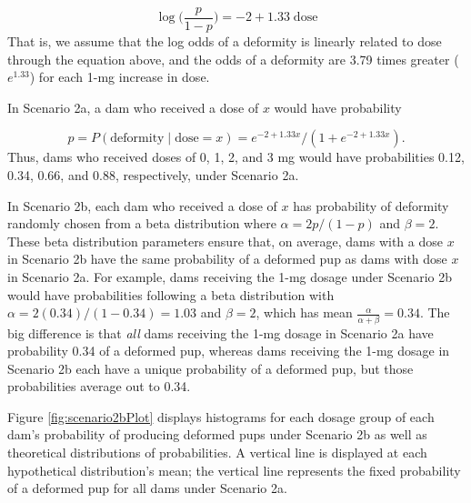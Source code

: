 \documentclass[
]{krantz}
\begin{document}
\[ \log \bigg(\frac{p}{1-p} \bigg) = -2 + 1.33\; \textrm{dose} \]
That is, we assume that the log odds of a deformity is linearly related to dose through the equation above, and the odds of a deformity are 3.79 times greater (\(e^{1.33}\)) for each 1-mg increase in dose.

In Scenario 2a, a dam who received a dose of \(x\) would have probability

\[p = P(\textrm{deformity}\mid \textrm{dose} = x) = e^{-2+1.33x}/(1+e^{-2+1.33x}). \]
Thus, dams who received doses of 0, 1, 2, and 3 mg would have probabilities 0.12, 0.34, 0.66, and 0.88, respectively, under Scenario 2a.

In Scenario 2b, each dam who received a dose of \(x\) has probability of deformity randomly chosen from a beta distribution where \(\alpha = 2p/(1-p)\) and \(\beta = 2\). These beta distribution parameters ensure that, on average, dams with a dose \(x\) in Scenario 2b have the same probability of a deformed pup as dams with dose \(x\) in Scenario 2a. For example, dams receiving the 1-mg dosage under Scenario 2b would have probabilities following a beta distribution with \(\alpha = 2(0.34)/(1-0.34) = 1.03\) and \(\beta = 2\), which has mean \(\frac{\alpha}{\alpha + \beta}=0.34\). The big difference is that \emph{all} dams receiving the 1-mg dosage in Scenario 2a have probability 0.34 of a deformed pup, whereas dams receiving the 1-mg dosage in Scenario 2b each have a unique probability of a deformed pup, but those probabilities average out to 0.34.

Figure \ref{fig:scenario2bPlot} displays histograms for each dosage group of each dam's probability of producing deformed pups under Scenario 2b as well as theoretical distributions of probabilities. A vertical line is displayed at each hypothetical distribution's mean; the vertical line represents the fixed probability of a deformed pup for all dams under Scenario 2a.
\end{document}
